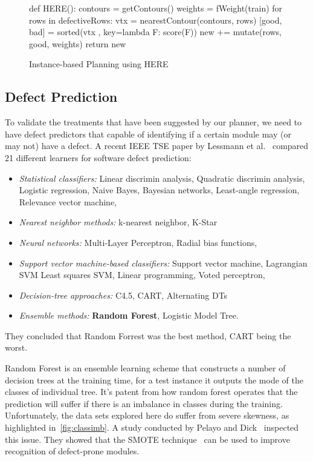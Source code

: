 \documentclass[conference]{IEEEtran}
\newcommand{\bi}{\begin{itemize}}
\newcommand{\ei}{\end{itemize}}
\begin{document}
{\begin{figure}[!t]
\begin{python}[right]
def HERE():
  contours = getContours()
  weights = fWeight(train)
  for rows in defectiveRows:
    vtx = nearestContour(contours, rows)
    [good, bad] = sorted(vtx
            , key=lambda F: score(F))
    new += mutate(rows, good, weights)
  return new
\end{python}
\caption{Instance-based Planning using HERE}
\label{fig:HERE}   
\end{figure}

\subsection{Defect Prediction}

To validate the treatments that have been suggested by our planner, we need to have defect predictors that capable of identifying if a certain module may (or may not) have a defect. A recent IEEE TSE paper by Lessmann et al.~\cite{lessmann} compared 21 different learners for software defect prediction: 
\bi
\item
{\em Statistical classifiers:}
Linear    discrimin analysis,
Quadratic discrimin analysis,
Logistic regression,
Naive Bayes,
Bayesian networks,
Least-angle regression,
Relevance vector machine,

\item
{\em Nearest neighbor methods:}
k-nearest neighbor,
K-Star

\item
{\em Neural networks:}
Multi-Layer Perceptron,
Radial bias functions,

\item
{\em Support vector machine-based classifiers:}
Support vector machine,
Lagrangian SVM
Least squares SVM,
Linear programming,
Voted perceptron,

\item
{\em Decision-tree approaches:}
C4.5,
CART,
Alternating DTs
\item
{\em Ensemble methods:}
\textbf{Random Forest},
Logistic Model Tree.
\ei

They concluded that Random Forrest was the best method, CART being the worst.

Random Forest is an ensemble learning scheme that constructs a number of decision trees at the training time, for a test instance it outputs the mode of the classes of individual tree. It's patent from how random forest operates that the prediction will suffer if there is an imbalance in classes during the training. Unfortunately, the data sets explored here do suffer from severe skewness, as highlighted in~\ref{fig:classimb}. A study conducted by Pelayo and Dick~\cite{smote2} inspected this issue. They showed that the SMOTE technique~\cite{smote} can be used to improve recognition of defect-prone modules. 

}
\end{document}
